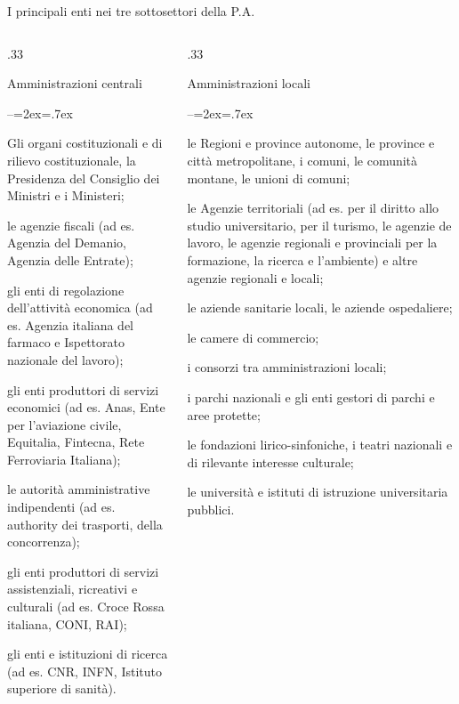 \documentclass[aspectratio=64,12pt]{beamer}
\newenvironment{nobulletlist}{\begin{list}{--}{\itemsep=3pt\itemindent=2ex\labelsep=.7ex\leftmargin=0pt}}{\end{list}}
\begin{document}
\begin{frame}{I principali enti nei tre sottosettori della P.A.}
\vspace*{-5mm}
\fontsize{8}{8.5}\selectfont
\begin{columns}[t]
\begin{column}{.33\columnwidth}
\begin{block}{\footnotesize Amministrazioni centrali}
\begin{nobulletlist}
\item Gli organi costituzionali e di rilievo costituzionale, la Presidenza del Consiglio dei Ministri e i Ministeri;
\item le agenzie fiscali (ad es. Agenzia del Demanio, Agenzia delle Entrate);
\item gli enti di regolazione dell’attività economica (ad es. Agenzia italiana del farmaco e Ispettorato nazionale del lavoro);
\item gli enti produttori di servizi economici (ad es. Anas, Ente per l’aviazione civile, Equitalia, Fintecna, Rete Ferroviaria Italiana);
\item le autorità amministrative indipendenti (ad es. authority dei trasporti, della concorrenza);
\item gli enti produttori di servizi assistenziali, ricreativi e culturali (ad es. Croce Rossa italiana, CONI, RAI);
\item gli enti e istituzioni di ricerca (ad es. CNR, INFN, Istituto superiore di sa\-nità).
\end{nobulletlist}
\end{block}
\end{column}

\begin{column}{.33\columnwidth}
\begin{block}{\footnotesize Amministrazioni locali}
\begin{nobulletlist}
\item le Regioni e province autonome, le province e città metropolitane, i comuni, le comunità montane, le unioni di comuni;
\item le Agenzie territoriali (ad es. per il diritto allo studio universitario, per il turismo, le agenzie de lavoro, le agenzie regionali e provinciali per la formazione, la ricerca e l’ambiente) e altre agenzie regionali e locali;
\item le aziende sanitarie locali, le aziende ospedaliere;
\item le camere di commercio;
\item i consorzi tra amministrazioni locali;
\item i parchi nazionali e gli enti gestori di parchi e aree protette;
\item le fondazioni lirico-sinfoniche, i teatri nazionali e di rilevante interesse culturale;
\item le università e istituti di istruzione universitaria pubblici.
\end{nobulletlist}
\end{block}
\end{column}


\end{columns}
\end{frame}
\end{document}
